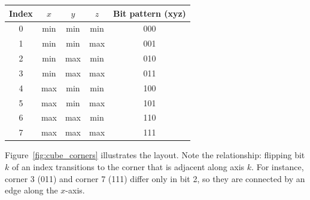 \documentclass[10pt,a4paper]{article}
\begin{document}
\begin{center}
\begin{tabular}{c|c|c|c|c}
  \toprule
  Index & $x$ & $y$ & $z$ & Bit pattern (xyz)\\
  \midrule
  0 & min & min & min & 000 \\
  1 & min & min & max & 001 \\
  2 & min & max & min & 010 \\
  3 & min & max & max & 011 \\
  4 & max & min & min & 100 \\
  5 & max & min & max & 101 \\
  6 & max & max & min & 110 \\
  7 & max & max & max & 111 \\
  \bottomrule
\end{tabular}
\end{center}

Figure~\ref{fig:cube_corners} illustrates the layout.  Note the
relationship: flipping bit $k$ of an index transitions to the
corner that is adjacent along axis $k$.  For instance,
corner 3 (011) and corner 7 (111) differ only in bit 2, so they are
connected by an edge along the $x$-axis.
\end{document}
